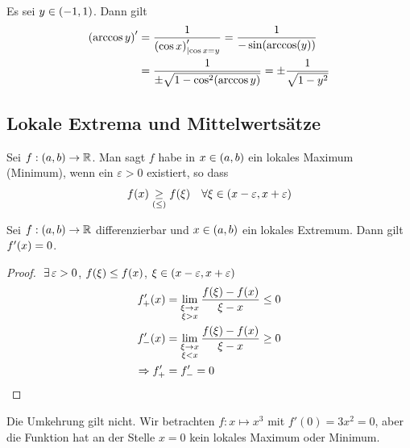 \begin{beispiel}
    Es sei $y\in\left(-1, 1\right)$. Dann gilt
    \begin{align*}
        \pair{\arccos y}' &= \frac{1}{\pair{\cos x}'_{\lvert \cos x = y}} = \frac{1}{-\sin\of{\arccos\of{y}}}\\
        &= \frac{1}{\pm\sqrt{1-\cos^2\of{\arccos y}}} = \pm \frac{1}{\sqrt{1-y^2}}
    \end{align*}
\end{beispiel}

\subsection{Lokale Extrema und Mittelwertsätze}

\begin{definition} %
    Sei $f: \left(a,b\right) \rightarrow{}\mathbb{R}$. Man sagt $f$ habe in $x\in\left(a,b\right)$ ein lokales Maximum (Minimum), wenn ein $\varepsilon > 0$ existiert, so dass
    \begin{align*}
        f\of{x} \underset{(\leq)}{\geq} f\of{\xi}\quad \forall \xi\in\pair{x-\varepsilon, x+\varepsilon}
    \end{align*}
\end{definition}

\begin{satz}
    \label{satz:ableitung-extrem}
    Sei $f: \left(a,b\right) \rightarrow{} \mathbb{R}$ differenzierbar und $x\in\left(a,b\right)$ ein lokales Extremum. Dann gilt $f'\of{x} = 0$.
    \begin{proof}
        $\;\exists\, \varepsilon > 0$, $f\of{\xi} \leq f\of{x}$, $\xi\in\left(x-\varepsilon, x+\varepsilon\right)$
        \begin{align*}
            f'_{+}\of{x} &= \lim_{\substack{\xi\fromto x\\ \xi > x}} \frac{f\of{\xi} - f\of{x}}{\xi - x} \leq 0\\
            f'_{-}\of{x} &= \lim_{\substack{\xi\fromto x\\ \xi < x}} \frac{f\of{\xi} - f\of{x}}{\xi - x} \geq 0\\
            \impl f'_{+} &= f'_{-} = 0\qedhere
        \end{align*}
    \end{proof}
\end{satz}

\begin{bemerkung}
    Die Umkehrung gilt nicht. Wir betrachten $f: x\mapsto x^3$ mit $f'(0) = 3x^2 = 0$, aber die Funktion hat an der Stelle $x=0$ kein lokales Maximum oder Minimum.
\end{bemerkung}

